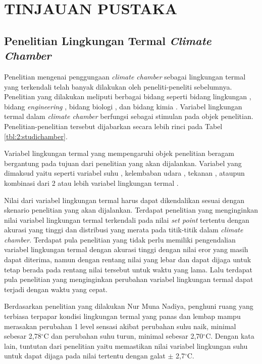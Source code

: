 \chapter{TINJAUAN PUSTAKA}
\label{pustaka}

\section{Penelitian Lingkungan Termal \textit{Climate Chamber}}

Penelitian mengenai penggungaan \textit{climate chamber} sebagai lingkungan termal yang terkendali telah banyak dilakukan oleh peneliti-peneliti sebelumnya. Penelitian yang dilakukan meliputi berbagai bidang seperti bidang lingkungan \cite{article2.1:1} \cite{article2.1:2} \cite{article2.1:4}, bidang \textit{engineering} \cite{article2.1:5}, bidang biologi \cite{article2.1:6}\cite{article2.1:7}, dan bidang kimia \cite{article2.1:8}. Variabel lingkungan termal dalam \textit{climate chamber} berfungsi sebagai stimulan pada objek penelitian. Penelitian-penelitian tersebut dijabarkan secara lebih rinci pada Tabel \ref{tbl:2:studichamber}.

Variabel lingkungan termal yang mempengaruhi objek penelitian beragam bergantung pada tujuan dari penelitian yang akan dijalankan. Variabel yang dimaksud yaitu seperti variabel suhu \cite{article2.1:5}\cite{article2.1:6}\cite{article2.1:7}\cite{article2.1:8}\cite{article2.1:9}, kelembaban udara \cite{article2.1:8}, tekanan \cite{article2.1:4}, ataupun kombinasi dari 2 atau lebih variabel lingkungan termal \cite{article2.1:8}.

Nilai dari variabel lingkungan termal harus dapat dikendalikan sesuai dengan skenario penelitian yang akan dijalankan. Terdapat penelitian yang menginginkan nilai variabel lingkungan termal terkendali pada nilai \textit{set point} tertentu dengan akurasi yang tinggi dan distribusi yang merata pada titik-titik dalam \textit{climate chamber}. Terdapat pula penelitian yang tidak perlu memiliki pengendalian variabel lingkungan termal dengan akurasi tinggi dengan nilai eror yang masih dapat diterima, namun dengan rentang nilai yang lebar dan dapat dijaga untuk tetap berada pada rentang nilai tersebut untuk waktu yang lama. Lalu terdapat pula penelitian yang menginginkan perubahan variabel lingkungan termal dapat terjadi dengan waktu yang cepat.

Berdasarkan penelitian yang dilakukan Nur Muna Nadiya\cite{skripsiMuna}, penghuni ruang yang terbiasa terpapar kondisi lingkungan termal yang panas dan lembap mampu merasakan perubahan 1 level sensasi akibat perubahan suhu naik, minimal sebesar 2,78$^{\circ}$C dan perubahan suhu turun, minimal sebesar 2,70$^{\circ}$C. Dengan kata lain, tuntutan dari penelitian yaitu memastikan nilai variabel lingkungan suhu untuk dapat dijaga pada nilai tertentu dengan galat $\pm$ 2,7$^{\circ}$C.

